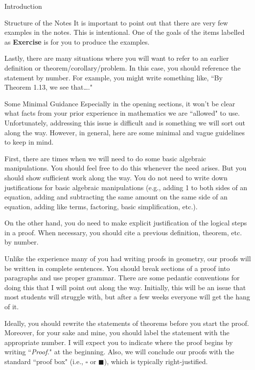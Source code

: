 \begin{chapter}{Introduction}
\begin{section}{Structure of the Notes}
It is important to point out that there are very few examples in the notes.  This is intentional.  One of the goals of the items labelled as \textbf{Exercise} is for you to produce the examples.

Lastly, there are many situations where you will want to refer to an earlier definition or theorem/corollary/problem.  In this case, you should reference the statement by number.  For example, you might write something like, ``By Theorem 1.13, we see that\ldots."

\end{section}

\begin{section}{Some Minimal Guidance}
Especially in the opening sections, it won't be clear what facts from your prior experience in mathematics we are ``allowed" to use.  Unfortunately, addressing this issue is difficult and is something we will sort out along the way.  However, in general, here are some minimal and vague guidelines to keep in mind.  

First, there are times when we will need to do some basic algebraic manipulations.  You should feel free to do this whenever the need arises.  But you should show sufficient work along the way.  You do not need to write down justifications for basic algebraic manipulations (e.g., adding 1 to both sides of an equation, adding and subtracting the same amount on the same side of an equation, adding like terms, factoring, basic simplification, etc.).  

On the other hand, you do need to make explicit justification of the logical steps in a proof.  When necessary, you should cite a previous definition, theorem, etc. by number.

Unlike the experience many of you had writing proofs in geometry, our proofs will be written in complete sentences.  You should break sections of a proof into paragraphs and use proper grammar.  There are some pedantic conventions for doing this that I will point out along the way.  Initially, this will be an issue that most students will struggle with, but after a few weeks everyone will get the hang of it.

Ideally, you should rewrite the statements of theorems before you start the proof.  Moreover, for your sake and mine, you should label the statement with the appropriate number.  I will expect you to indicate where the proof begins by writing ``\emph{Proof.}" at the beginning.  Also, we will conclude our proofs with the standard ``proof box" (i.e., $\square$ or $\blacksquare$), which is typically right-justified.


\end{section}
\end{chapter}
